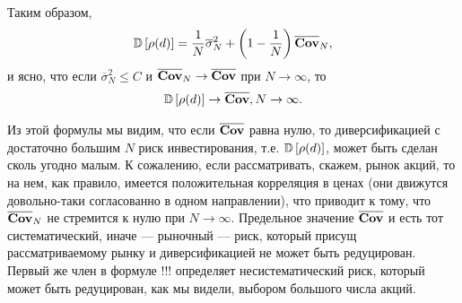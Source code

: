 Таким образом,
\begin{align}
\mathbb{D}\left[\rho(d)\right] = \frac{1}{N} \overline{\sigma}_N^2 + \left(1 - \frac{1}{N}\right) \overline{\textbf{Cov}}_N ,
\end{align}
и ясно, что если $\overline{\sigma}_N^2 \le C$ и $\overline{\textbf{Cov}}_N \rightarrow \overline{\textbf{Cov}}$ при $N \rightarrow \infty$, то
\begin{align}
\mathbb{D}\left[\rho(d)\right] \rightarrow \overline{\textbf{Cov}}, N \rightarrow \infty .
\end{align}

Из этой формулы мы видим, что если $\overline{\textbf{Cov}}$ равна нулю, то диверсификацией с достаточно большим $N$ риск инвестирования,
т.е. $\mathbb{D}\left[\rho(d)\right]$, может быть сделан сколь угодно малым. К сожалению, если рассматривать, скажем, рынок акций, то на нем, как правило,
имеется положительная корреляция в ценах (они движутся довольно-таки согласованно в одном направлении), что приводит к тому, что
$\overline{\textbf{Cov}}_N$ не стремится к нулю при $N \rightarrow \infty$. Предельное значение $\overline{\textbf{Cov}}$ и есть тот систематический,
иначе --- рыночный --- риск, который присущ рассматриваемому рынку и диверсификацией не может быть редуцирован. Первый же член в формуле
!!! определяет несистематический риск, который может быть редуцирован, как мы видели, выбором большого числа акций.